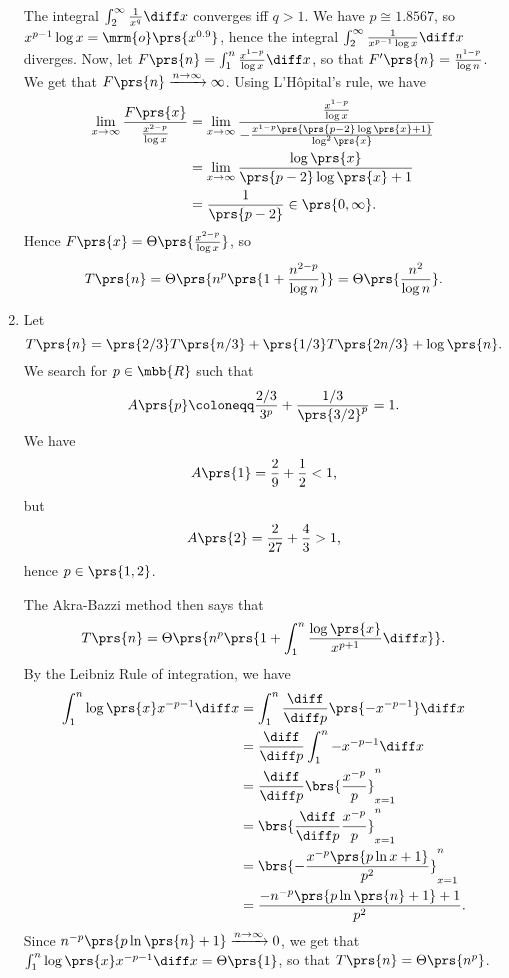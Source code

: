 \documentclass[oneside]{scrbook}
\theoremstyle{definition}
\begin{document}
\begin{exercise}
\begin{enumerate}[label = \alph*.]
The integral $\int_2^\infty \frac{1}{x^q} \diff x$ converges iff $q > 1$. We have $p \cong 1.8567$, so $x^{p-1} \log x = \mrm{o}\prs{x^{0.9}}$, hence the integral $\int_2^{\infty} \frac{1}{x^{p-1} \log x} \diff x$ diverges.
Now, let $F\prs{n} = \int_1^n \frac{x^{1-p}}{\log x} \diff x$, so that $F'\prs{n} = \frac{n^{1-p}}{\log n}$. We get that $F\prs{n} \xrightarrow{n\to\infty} \infty$.
Using L'Hôpital's rule, we have
\begin{align*}
\lim_{x \to \infty} \frac{F\prs{x}}{\frac{x^{2-p}}{\log x}} &= \lim_{x\to\infty} \frac{\frac{x^{1-p}}{\log x}}{- \frac{x^{1-p} \prs{\prs{p-2} \log\prs{x} + 1}}{\log^2\prs{x}}}
\\&= \lim_{x \to \infty} \frac{\log\prs{x}}{\prs{p-2} \log\prs{x} + 1}
\\&= \frac{1}{\prs{p-2}} \in \prs{0, \infty} \text{.}
\end{align*}
Hence $F\prs{x} = \Theta\prs{\frac{x^{2-p}}{\log x}}$, so
\begin{align*}
T\prs{n} = \Theta\prs{n^p\prs{1 + \frac{n^{2-p}}{\log n}}} = \Theta\prs{\frac{n^2}{\log n}} \text{.}
\end{align*}

\item %

Let
\[T\prs{n} = \prs{2/3} T\prs{n/3} + \prs{1/3} T\prs{2n / 3} + \log\prs{n} \text{.}\]
We search for $p \in \mbb{R}$ such that
\begin{align*}
A\prs{p} \coloneqq \frac{2/3}{3^p} + \frac{1/3}{\prs{3/2}^p} = 1 \text{.}
\end{align*}
We have
\begin{align*}
A\prs{1} = \frac{2}{9} + \frac{1}{2} < 1 \text{,}
\end{align*}
but
\begin{align*}
A\prs{2} = \frac{2}{27} + \frac{4}{3} > 1 \text{,}
\end{align*}
hence $p \in \prs{1,2}$.

The Akra-Bazzi method then says that
\begin{align*}
T\prs{n} = \Theta\prs{n^p \prs{1 + \int_1^n \frac{\log\prs{x}}{x^{p+1}} \diff x}} \text{.}
\end{align*}
By the Leibniz Rule of integration, we have
\begin{align*}
\int_1^n \log\prs{x} x^{-p-1} \diff x &= \int_1^n \frac{\diff}{\diff p} \prs{-x^{-p-1}} \diff x
\\&=
\frac{\diff}{\diff p} \int_1^n - x^{-p-1} \diff x
\\&=
\frac{\diff}{\diff p} \brs{\frac{x^{-p}}{p}}_{x=1}^n
\\&=
\brs{\frac{\diff}{\diff p} \frac{x^{-p}}{p}}_{x=1}^n
\\&=
\brs{- \frac{x^{-p} \prs{p \ln x + 1}}{p^2}}_{x=1}^n
\\&=
\frac{-n^{-p} \prs{p \ln\prs{n} + 1} + 1}{p^2} \text{.}
\end{align*}
Since $n^{-p} \prs{p\ln\prs{n}+1} \xrightarrow{n\to\infty} 0$, we get that $\int_1^n \log\prs{x} x^{-p-1} \diff x = \Theta\prs{1}$, so that $T\prs{n} = \Theta\prs{n^p}$.


\end{enumerate}
\end{exercise}
\end{document}
